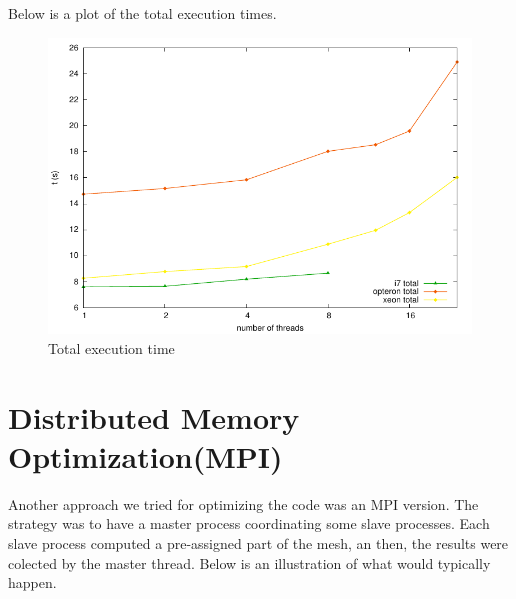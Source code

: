 \documentclass[a4paper,10pt,openright,openbib,twocolumn]{article}
\begin{document}
Below is a plot of the total execution times.

\begin{figure}[H]
    \centering
    \begin{minipage}[t]{\columnwidth}
        \includegraphics[width=\textwidth]{../../../openmp/results/total.pdf}
        \caption{Total execution time \label{fig:total}}
    \end{minipage}
\end{figure}

\section{Distributed Memory Optimization(MPI)}

Another approach we tried for optimizing the code was an MPI version. The strategy was to have a master process coordinating some slave processes. Each slave process computed a pre-assigned part of the mesh, an then, the results were colected by the master thread. Below is an illustration of what would typically happen.
\end{document}

